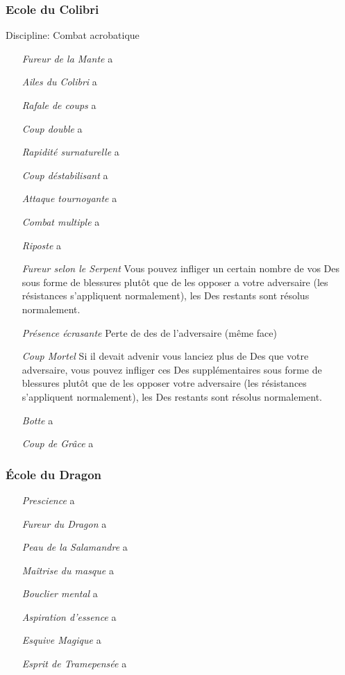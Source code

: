 \subsubsection{Ecole du Colibri}
Discipline: Combat acrobatique
\begin{itemize}
\item[\em Fureur de la Mante] a
\item[\em Ailes du Colibri] a
\item[\em Rafale de coups] a
\item[\em Coup double] a
\item[\em Rapidité surnaturelle]  a
\item[\em Coup déstabilisant] a
\item[\em Attaque tournoyante] a
\item[\em Combat multiple] a
\item[\em Riposte] a
\item[\em Fureur selon le Serpent] Vous pouvez infliger un certain nombre de vos Des sous forme de blessures plutôt que de les opposer a votre adversaire 
(les résistances s’appliquent normalement), les Des restants sont résolus normalement.
\item[\em Présence écrasante]\Meta{ } Perte de des de l’adversaire (même face)
\item[\em Coup Mortel] Si il devait advenir vous lanciez plus de Des que votre adversaire, 
vous pouvez infliger ces Des supplémentaires sous forme de blessures plutôt que de les opposer votre adversaire 
(les résistances s’appliquent normalement), les Des restants sont résolus normalement.
\item[\em Botte] a
\item[\em Coup de Grâce] a
\end{itemize}

\subsubsection{École du Dragon}
\begin{itemize}
\item[\em Prescience] a
\item[\em Fureur du Dragon] a
\item[\em Peau de la Salamandre] a
\item[\em Maîtrise du masque] a
\item[\em Bouclier mental] a
\item[\em Aspiration d’essence] a
\item[\em Esquive Magique] a
\item[\em Esprit de Tramepensée] a
\end{itemize}

